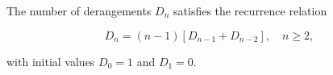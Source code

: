 The number of derangements $D_n$ satisfies the recurrence relation

$$D_n = (n-1)[D_{n-1} + D_{n-2}], \quad n \geq 2,$$

with initial values $D_0 = 1$ and $D_1 = 0$.

